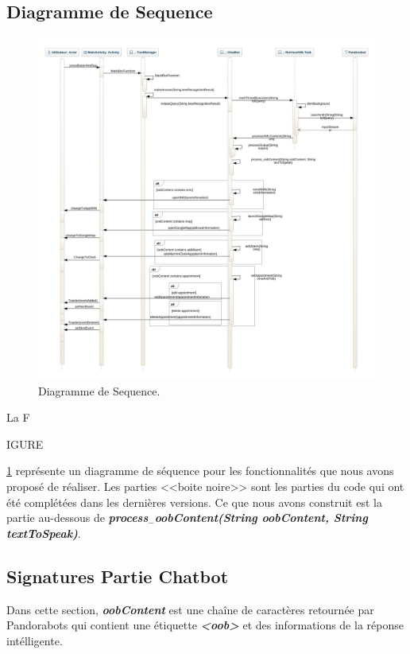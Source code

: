 \subsection{Diagramme de Sequence}

\begin{figure}[ht]
\centering
\includegraphics[scale=0.4]{./diagrammes/SequenceDiagram.jpeg}
\caption{Diagramme de Sequence.\label{fig3}}
\end{figure}

\indent La F\begin{footnotesize}IGURE\end{footnotesize} \ref{fig3} représente un diagramme de séquence pour les fonctionnalités que nous avons proposé de réaliser. Les parties <<boite noire>> sont les parties du code qui ont été complétées dans les dernières versions. Ce que nous avons construit est la partie au-dessous de \textbf{\emph{process$_-$oobContent(String oobContent, String textToSpeak)}}.
\newpage

\subsection{Signatures Partie Chatbot}

\indent Dans cette section, \textbf{\emph{oobContent}} est une chaîne de caractères retournée par Pandorabots qui contient une étiquette \textbf{\emph{<oob>}} et des informations de la réponse intélligente.

